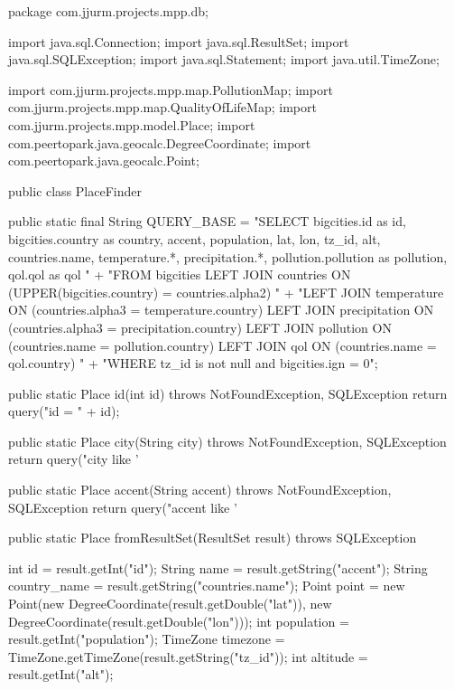 \begin{javacode}
package com.jjurm.projects.mpp.db;

import java.sql.Connection;
import java.sql.ResultSet;
import java.sql.SQLException;
import java.sql.Statement;
import java.util.TimeZone;

import com.jjurm.projects.mpp.map.PollutionMap;
import com.jjurm.projects.mpp.map.QualityOfLifeMap;
import com.jjurm.projects.mpp.model.Place;
import com.peertopark.java.geocalc.DegreeCoordinate;
import com.peertopark.java.geocalc.Point;

public class PlaceFinder {

  public static final String QUERY_BASE =
      "SELECT bigcities.id as id, bigcities.country as country, accent, population, lat, lon, tz_id, alt, countries.name, temperature.*, precipitation.*, pollution.pollution as pollution, qol.qol as qol "
          + "FROM bigcities LEFT JOIN countries ON (UPPER(bigcities.country) = countries.alpha2) "
          + "LEFT JOIN temperature ON (countries.alpha3 = temperature.country) LEFT JOIN precipitation ON (countries.alpha3 = precipitation.country) LEFT JOIN pollution ON (countries.name = pollution.country) LEFT JOIN qol ON (countries.name = qol.country) "
          + "WHERE tz_id is not null and bigcities.ign = 0";

  public static Place id(int id) throws NotFoundException, SQLException {
    return query("id = " + id);
  }

  public static Place city(String city) throws NotFoundException, SQLException {
    return query("city like '%
  }

  public static Place accent(String accent) throws NotFoundException, SQLException {
    return query("accent like '%
  }

  public static Place fromResultSet(ResultSet result) throws SQLException {
    int id = result.getInt("id");
    String name = result.getString("accent");
    String country_name = result.getString("countries.name");
    Point point = new Point(new DegreeCoordinate(result.getDouble("lat")),
        new DegreeCoordinate(result.getDouble("lon")));
    int population = result.getInt("population");
    TimeZone timezone = TimeZone.getTimeZone(result.getString("tz_id"));
    int altitude = result.getInt("alt");

}}
\end{javacode}
